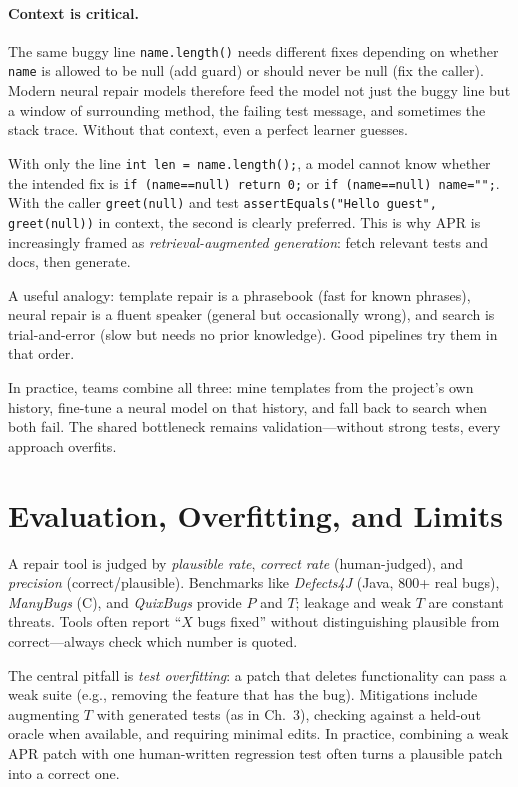 \paragraph{Context is critical.} The same buggy line \texttt{name.length()} needs different fixes depending on whether \texttt{name} is allowed to be null (add guard) or should never be null (fix the caller). Modern neural repair models therefore feed the model not just the buggy line but a window of surrounding method, the failing test message, and sometimes the stack trace. Without that context, even a perfect learner guesses.

\begin{example}
With only the line \texttt{int len = name.length();}, a model cannot know whether the intended fix is \texttt{if (name==null) return 0;} or \texttt{if (name==null) name="";}. With the caller \texttt{greet(null)} and test \texttt{assertEquals("Hello guest", greet(null))} in context, the second is clearly preferred. This is why APR is increasingly framed as \emph{retrieval-augmented generation}: fetch relevant tests and docs, then generate.
\end{example}

A useful analogy: template repair is a phrasebook (fast for known phrases), neural repair is a fluent speaker (general but occasionally wrong), and search is trial-and-error (slow but needs no prior knowledge). Good pipelines try them in that order.

In practice, teams combine all three: mine templates from the project's own history, fine-tune a neural model on that history, and fall back to search when both fail. The shared bottleneck remains validation---without strong tests, every approach overfits.

\section{Evaluation, Overfitting, and Limits}
\label{sec:eval-repair}
A repair tool is judged by \emph{plausible rate}, \emph{correct rate} (human-judged), and \emph{precision} (correct/plausible). Benchmarks like \emph{Defects4J} (Java, 800+ real bugs), \emph{ManyBugs} (C), and \emph{QuixBugs} provide $P$ and $T$; leakage and weak $T$ are constant threats. Tools often report ``$X$ bugs fixed'' without distinguishing plausible from correct---always check which number is quoted.

The central pitfall is \emph{test overfitting}: a patch that deletes functionality can pass a weak suite (e.g., removing the feature that has the bug). Mitigations include augmenting $T$ with generated tests (as in Ch.~3), checking against a held-out oracle when available, and requiring minimal edits. In practice, combining a weak APR patch with one human-written regression test often turns a plausible patch into a correct one.

